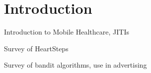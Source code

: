 \chapter{Introduction}
\label{introduction}

Introduction to Mobile Healthcare, JITIs

Survey of HeartSteps

Survey of bandit algorithms, use in advertising